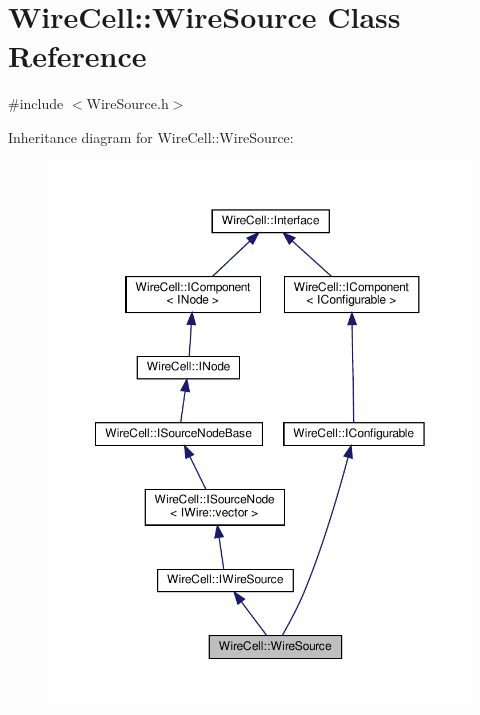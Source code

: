 \hypertarget{class_wire_cell_1_1_wire_source}{}\section{Wire\+Cell\+:\+:Wire\+Source Class Reference}
\label{class_wire_cell_1_1_wire_source}


{\ttfamily \#include $<$Wire\+Source.\+h$>$}



Inheritance diagram for Wire\+Cell\+:\+:Wire\+Source\+:
\nopagebreak
\begin{figure}[H]
\begin{center}
\leavevmode
\includegraphics[width=350pt]{class_wire_cell_1_1_wire_source__inherit__graph}
\end{center}
\end{figure}


